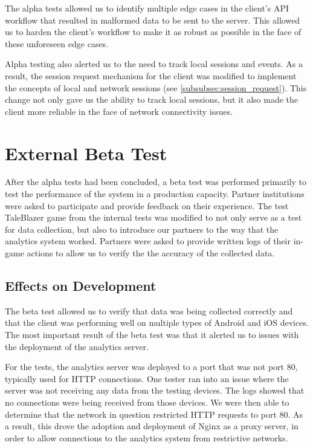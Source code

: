 The alpha tests allowed us to identify multiple edge cases in the client's API workflow that resulted in malformed data to be sent to the server. This allowed us to harden the client's workflow to make it as robust as possible in the face of these unforeseen edge cases. 

Alpha testing also alerted us to the need to track local sessions and events. As a result, the session request mechanism for the client was modified to implement the concepts of local and network sessions (see \ref{subsubsec:session_request}). This change not only gave us the ability to track local sessions, but it also made the client more reliable in the face of network connectivity issues. 

\section{External Beta Test}

After the alpha tests had been concluded, a beta test was performed primarily to test the performance of the system in a production capacity. Partner institutions were asked to participate and provide feedback on their experience. The test TaleBlazer game from the internal tests was modified to not only serve as a test for data collection, but also to introduce our partners to the way that the analytics system worked. Partners were asked to provide written logs of their in-game actions to allow us to verify the the accuracy of the collected data.

\subsection{Effects on Development}

The beta test allowed us to verify that data was being collected correctly and that the client was performing well on multiple types of Android and iOS devices. The most important result of the beta test was that it alerted us to issues with the deployment of the analytics server.

For the tests, the analytics server was deployed to a port that was not port 80, typically used for HTTP connections. One tester ran into an issue where the server was not receiving any data from the testing devices. The logs showed that no connections were being received from those devices. We were then able to determine that the network in question restricted HTTP requests to port 80. As a result, this drove the adoption and deployment of Nginx as a proxy server, in order to allow connections to the analytics system from restrictive networks.









